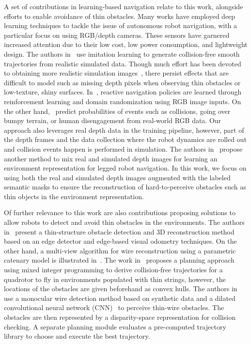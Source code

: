 A set of contributions in learning-based navigation relate to this work, alongside efforts to enable avoidance of thin obstacles. Many works have employed deep learning techniques to tackle the issue of autonomous robot navigation, with a particular focus on using RGB/depth cameras. These sensors have garnered increased attention due to their low cost, low power consumption, and lightweight design.
The authors in~\cite{Loquercio2021Science,Tolani2021visual} use imitation learning to generate collision-free smooth trajectories from realistic simulated data.
Though much effort has been devoted to obtaining more realistic simulation images~\cite{Zakharov2022photo_realistic,Bousmalis2018DomainAdaptation}, there persist effects that are difficult to model such as missing depth pixels when observing thin obstacles or low-texture, shiny surfaces.
In~\cite{Fereshteh2017CAD2RL}, reactive navigation policies are learned through reinforcement learning and domain randomization using RGB image inputs.
On the other hand,~\cite{Gandhi2017learning2fly,Kahn2021BADGR,Kahn2021LAND} predict probabilities of events such as collisions, going over bumpy terrain, or human disengagement from real-world RGB data.
Our approach also leverages real depth data in the training pipeline, however, part of the depth frames and the data collection where the robot dynamics are rolled out and collision events happen is performed in simulation.
The authors in~\cite{Hoeller2021representation} propose another method to mix real and simulated depth images for learning an environment representation for legged robot navigation. In this work, we focus on using both the real and simulated depth images augmented with the labeled semantic masks to ensure the reconstruction of hard-to-perceive obstacles such as thin objects in the environment representation.

Of further relevance to this work are also contributions proposing solutions to allow robots to detect and avoid thin obstacles in the environments. The authors in~\cite{Zhou2017FastAT} present a thin-structure obstacle detection and 3D reconstruction method based on an edge detector and edge-based visual odometry techniques. On the other hand, a multi-view algorithm for wire reconstruction using a parametric catenary model is illustrated in~\cite{Madaan2019MultiviewRO}. The work in~\cite{Landry2016MIP} proposes a planning approach using mixed integer programming to derive collision-free trajectories for a quadrotor to fly in environments populated with thin strings, however, the locations of the obstacles are given beforehand as convex hulls. The authors in~\cite{Dubey2018droan} use a monocular wire detection method based on synthetic data and a dilated convolutional neural network (CNN)~\cite{Madaan2017WireDU} to perceive thin-wire obstacles. The obstacles are then represented by a disparity-space representation for collision checking. A separate planning module evaluates a pre-computed trajectory library to choose and execute the best trajectory.
